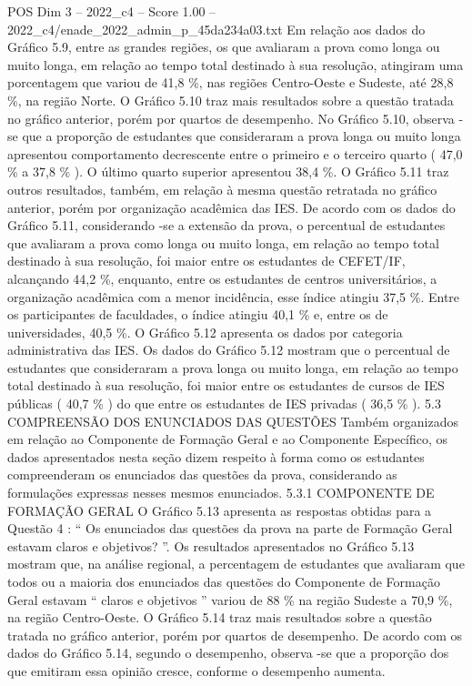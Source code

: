 \begin{textsample}{POS Dim 3 – 2022\_c4 – Score 1.00 – 2022\_c4/enade\_2022\_admin\_p\_45da234a03.txt}
Em relação aos dados do Gráfico 5.9, entre as grandes regiões, os que avaliaram a prova como longa ou muito longa, em relação ao tempo total destinado à sua resolução, atingiram uma porcentagem que variou de 41,8 \%, nas regiões Centro-Oeste e Sudeste, até 28,8 \%, na região Norte.
O Gráfico 5.10 traz mais resultados sobre a questão tratada no gráfico anterior, porém por quartos de desempenho.
No Gráfico 5.10, observa -se que a proporção de estudantes que consideraram a prova longa ou muito longa apresentou comportamento decrescente entre o primeiro e o terceiro quarto ( 47,0 \% a 37,8 \% ).
O último quarto superior apresentou 38,4 \%.
O Gráfico 5.11 traz outros resultados, também, em relação à mesma questão retratada no gráfico anterior, porém por organização acadêmica das IES.
De acordo com os dados do Gráfico 5.11, considerando -se a extensão da prova, o percentual de estudantes que avaliaram a prova como longa ou muito longa, em relação ao tempo total destinado à sua resolução, foi maior entre os estudantes de CEFET/IF, alcançando 44,2 \%, enquanto, entre os estudantes de centros universitários, a organização acadêmica com a menor incidência, esse índice atingiu 37,5 \%.
Entre os participantes de faculdades, o índice atingiu 40,1 \% e, entre os de universidades, 40,5 \%.
O Gráfico 5.12 apresenta os dados por categoria administrativa das IES.
Os dados do Gráfico 5.12 mostram que o percentual de estudantes que consideraram a prova longa ou muito longa, em relação ao tempo total destinado à sua resolução, foi maior entre os estudantes de cursos de IES públicas ( 40,7 \% ) do que entre os estudantes de IES privadas ( 36,5 \% ). 5.3 COMPREENSÃO DOS ENUNCIADOS DAS QUESTÕES Também organizados em relação ao Componente de Formação Geral e ao Componente Específico, os dados apresentados nesta seção dizem respeito à forma como os estudantes compreenderam os enunciados das questões da prova, considerando as formulações expressas nesses mesmos enunciados. 5.3.1 COMPONENTE DE FORMAÇÃO GERAL O Gráfico 5.13 apresenta as respostas obtidas para a Questão 4 : “ Os enunciados das questões da prova na parte de Formação Geral estavam claros e objetivos? ”.
Os resultados apresentados no Gráfico 5.13 mostram que, na análise regional, a percentagem de estudantes que avaliaram que todos ou a maioria dos enunciados das questões do Componente de Formação Geral estavam “ claros e objetivos ” variou de 88 \% na região Sudeste a 70,9 \%, na região Centro-Oeste.
O Gráfico 5.14 traz mais resultados sobre a questão tratada no gráfico anterior, porém por quartos de desempenho.
De acordo com os dados do Gráfico 5.14, segundo o desempenho, observa -se que a proporção dos que emitiram essa opinião cresce, conforme o desempenho aumenta.

\end{textsample}
